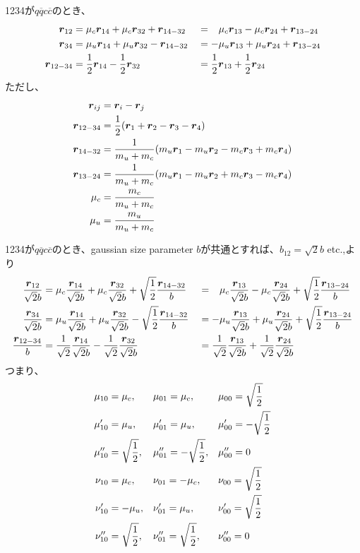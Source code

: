 \documentclass[a4j]{jarticle}
\def\cbar{\overline{{c}}}
\def\qbar{\overline{{q}}}
\newcommand{\xbld}[1]{\mbox{\boldmath $#1$}}
\def\vecr{{\xbld{r}}}
\begin{document}
1234が$q\qbar c\cbar$のとき、
\begin{align}
{\vecr_{12}}&=\mu_c{\vecr_{14}}+\mu_c{\vecr_{32}}+{\vecr_{14-32}}
&&=\phantom{-}\mu_c{\vecr_{13}}-\mu_c{\vecr_{24}}+{\vecr_{13-24}}
\\
{\vecr_{34}}&=\mu_u{\vecr_{14}}+\mu_u{\vecr_{32}}-{\vecr_{14-32}}
&&=-\mu_u{\vecr_{13}}+\mu_u{\vecr_{24}}+{\vecr_{13-24}}
\\
{\vecr_{12-34}}&={1\over 2}{\vecr_{14}}-{1\over 2}{\vecr_{32}}
&&={1\over 2}{\vecr_{13}}+{1\over 2 }{\vecr_{24}}
\end{align}
ただし、
\begin{align}
\vecr_{ij}&=\vecr_i-\vecr_j
\\
\vecr_{12-34}&= {1\over 2} (\vecr_1+\vecr_2-\vecr_3-\vecr_4)
\\
\vecr_{14-32}&= {1\over m_u+m_c} (m_u\vecr_1-m_u\vecr_2-m_c\vecr_3+m_c\vecr_4)
\\
\vecr_{13-24}&= {1\over m_u+m_c} (m_u\vecr_1-m_u\vecr_2+m_c\vecr_3-m_c\vecr_4)
\\
\mu_c&={m_c\over m_u+m_c}
\\
\mu_u&={m_u\over m_u+m_c}
\end{align}


1234が$q\qbar c\cbar$のとき、gaussian size parameter $b$が共通とすれば、$b_{12}=\sqrt{2}b$ etc.,より
\begin{align}
{\vecr_{12}\over \sqrt{2} b}&=\mu_c{\vecr_{14}\over \sqrt{2} b}+\mu_c{\vecr_{32}\over \sqrt{2} b}+\sqrt{1\over 2}{\vecr_{14-32}\over  b}
&&=\phantom{-}\mu_c{\vecr_{13}\over \sqrt{2} b}-\mu_c{\vecr_{24}\over \sqrt{2} b}+\sqrt{1\over 2}{\vecr_{13-24}\over  b}
\\
{\vecr_{34}\over \sqrt{2} b}&=\mu_u{\vecr_{14}\over \sqrt{2} b}+\mu_u{\vecr_{32}\over \sqrt{2} b}-\sqrt{1\over 2}{\vecr_{14-32}\over  b}
&&=-\mu_u{\vecr_{13}\over \sqrt{2} b}+\mu_u{\vecr_{24}\over \sqrt{2} b}+\sqrt{1\over 2}{\vecr_{13-24}\over  b}
\\
{\vecr_{12-34}\over b}&={1\over \sqrt{2}}{\vecr_{14}\over \sqrt{2} b}-{1\over \sqrt{2}}{\vecr_{32}\over \sqrt{2} b}
&&={1\over \sqrt{2}}{\vecr_{13}\over \sqrt{2} b}+{1\over \sqrt{2}}{\vecr_{24}\over \sqrt{2} b}
\end{align}
つまり、
\begin{align}
\mu_{10}&=\mu_c, && \mu_{01}=\mu_c, &&\mu_{00}=\sqrt{1\over 2}
\\
\mu'_{10}&=\mu_u, && \mu'_{01}=\mu_u, &&\mu'_{00}=-\sqrt{1\over 2}
\\
\mu''_{10}&=\sqrt{1\over 2}, && \mu''_{01}=-\sqrt{1\over 2}, &&\mu''_{00}=0
\\
\nu_{10}&=\mu_c, && \nu_{01}=-\mu_c, &&\nu_{00}=\sqrt{1\over 2}
\\
\nu'_{10}&=-\mu_u, && \nu'_{01}=\mu_u, &&\nu'_{00}=\sqrt{1\over 2}
\\
\nu''_{10}&=\sqrt{1\over 2}, && \nu''_{01}=\sqrt{1\over 2}, &&\nu''_{00}=0
\end{align}
\end{document}
